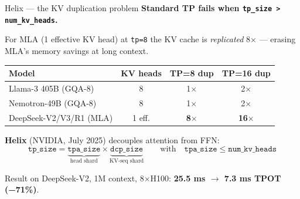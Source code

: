 \documentclass[aspectratio=169,10pt]{beamer}
\begin{document}
\begin{frame}{Helix --- the KV duplication problem}
  \footnotesize
  \textbf{Standard TP fails when \texttt{tp\_size > num\_kv\_heads}.}

  For MLA (1 effective KV head) at \texttt{tp=8} the KV cache is \emph{replicated} 8$\times$
  --- erasing MLA's memory savings at long context.

  \vspace{0.4cm}
  \begin{tabular}{lccc}
    \toprule
    Model & KV heads & TP=8 dup & TP=16 dup \\
    \midrule
    Llama-3 405B (GQA-8) & 8   & 1$\times$ & 2$\times$ \\
    Nemotron-49B (GQA-8) & 8   & 1$\times$ & 2$\times$ \\
    DeepSeek-V2/V3/R1 (MLA) & 1 eff. & \textcolor{slred}{\textbf{8$\times$}} & \textcolor{slred}{\textbf{16$\times$}} \\
    \bottomrule
  \end{tabular}

  \vspace{0.4cm}
  \textbf{Helix} (NVIDIA, July 2025) decouples attention from FFN:
  \[
    \boxed{\texttt{tp\_size} = \underbrace{\texttt{tpa\_size}}_{\text{head shard}}
                             \times \underbrace{\texttt{dcp\_size}}_{\text{KV-seq shard}}}
    \qquad \text{with}\quad \texttt{tpa\_size} \le \texttt{num\_kv\_heads}
  \]

  Result on DeepSeek-V2, 1M context, 8$\times$H100: \textcolor{slred}{\textbf{25.5 ms $\to$ 7.3 ms TPOT (−71\%)}}.
\end{frame}
\end{document}
